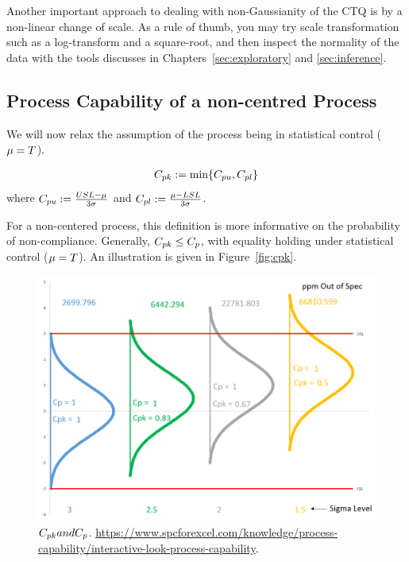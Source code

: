 Another important approach to dealing with non-Gaussianity of the CTQ is by a non-linear change of scale.
As  a rule of thumb, you may try scale transformation such as a log-transform and a square-root, and then inspect the normality of the data with the tools discusses in Chapters~\ref{sec:exploratory} and \ref{sec:inference}.




\subsection{Process Capability of a non-centred Process}
We will now relax the assumption of the process being in statistical control ($\mu=T$).

\begin{definition}[$\cpk$]
\begin{align}
	C_{pk}:= \min\{ C_{pu},C_{pl} \}
\end{align}
where $C_{pu}:= \frac{USL- \mu}{3 \sigma}$ and $C_{pl}:= \frac{\mu-LSL}{3 \sigma}$.
\end{definition}
For a non-centered process, this definition is more informative on the probability of non-compliance.
Generally, $C_{pk} \leq C_p$, with equality holding under statistical control ($\mu=T$).
An illustration is given in Figure~\ref{fig:cpk}.

\begin{figure}
\centering
\includegraphics[height=0.3\textheight]{art/Cpk_same_sigma_varying_avg}
\caption[$\cpk$ and $\cp$]{$C_{pk} and C_p$. \newline
\url{https://www.spcforexcel.com/knowledge/process-capability/interactive-look-process-capability}.}
\label{fig:Cpk_same_sigma_varying_avg}
\end{figure}

